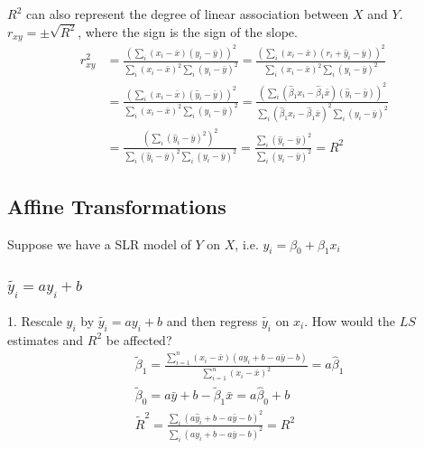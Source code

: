 \documentclass[11pt,a4paper]{article}
\begin{document}
$R^2$ can also represent the degree of linear association between $X$ and $Y$.\\
$r_{xy}= \pm \sqrt{R^2}$, where the sign is the sign of the slope.
\begin{equation}
    \begin{aligned}
       r_{xy}^2
       &=\frac{(\sum_{i}\left(x_{i}-\bar{x}\right)\left(y_{i}-\bar{y}\right))^2}{\sum_{i}\left(x_{i}-\bar{x}\right)^{2}\sum_{i}\left(y_{i}-\bar{y}\right)^{2}}=\frac{(\sum_{i}\left(x_{i}-\bar{x}\right)\left(r_i+\hat{y}_{i}-\bar{y}\right))^2}{\sum_{i}\left(x_{i}-\bar{x}\right)^{2}\sum_{i}\left(y_{i}-\bar{y}\right)^{2}}\\
       &=\frac{(\sum_{i}\left(x_{i}-\bar{x}\right)\left(\hat{y}_{i}-\bar{y}\right))^2}{\sum_{i}\left(x_{i}-\bar{x}\right)^{2}\sum_{i}\left(y_{i}-\bar{y}\right)^{2}}=\frac{(\sum_{i}\left(\hat{\beta}_1 x_{i}-\hat{\beta}_1 \bar{x}\right)\left(\hat{y}_{i}-\bar{y}\right))^2}{\sum_{i}\left(\hat{\beta}_1 x_{i}-\hat{\beta}_1 \bar{x}\right)^{2}\sum_{i}\left(y_{i}-\bar{y}\right)^{2}}\\
       &=\frac{(\sum_{i}\left(\hat{y}_{i}-\bar{y}\right)^2)^2}{\sum_{i}\left(\hat{y}_{i}-\bar{y}\right)^{2}\sum_{i}\left(y_{i}-\bar{y}\right)^{2}}=\frac{\sum_{i}\left(\hat{y}_{i}-\bar{y}\right)^{2}}{\sum_{i}\left(y_{i}-\bar{y}\right)^{2}}=R^2
    \end{aligned}
    \nonumber
\end{equation}

\subsection{Affine Transformations}
Suppose we have a SLR model of $Y$ on $X$, i.e. $y_i=\beta_0+\beta_1x_i$\\
\subsubsection{$\tilde{y_i}=ay_i+b$}
1. Rescale $y_i$ by $\tilde{y_i}=ay_i+b$ and then regress $\tilde{y_i}$ on $x_i$. How would the $LS$ estimates and $R^2$ be affected?
\begin{equation}
    \begin{aligned}
        &\tilde{\beta}_1=\frac{\sum_{i=1}^{n}\left(x_{i}-\bar{x}\right)\left(ay_{i}+b-a\bar{y}-b\right)}{\sum_{i=1}^{n}\left(x_{i}-\bar{x}\right)^{2}}=a \hat{\beta}_1\\
        &\tilde{\beta}_0=a\bar{y}+b-\tilde{\beta}_{1}\bar{x}=a \hat{\beta}_0+b\\
        &\tilde{R}^2=\frac{\sum_{i}\left(a\hat{y}_{i}+b-a\bar{y}-b\right)^{2}}{\sum_{i}\left(ay_{i}+b-a\bar{y}-b\right)^{2}}=R^2
    \end{aligned}
    \nonumber
\end{equation}
\end{document}
